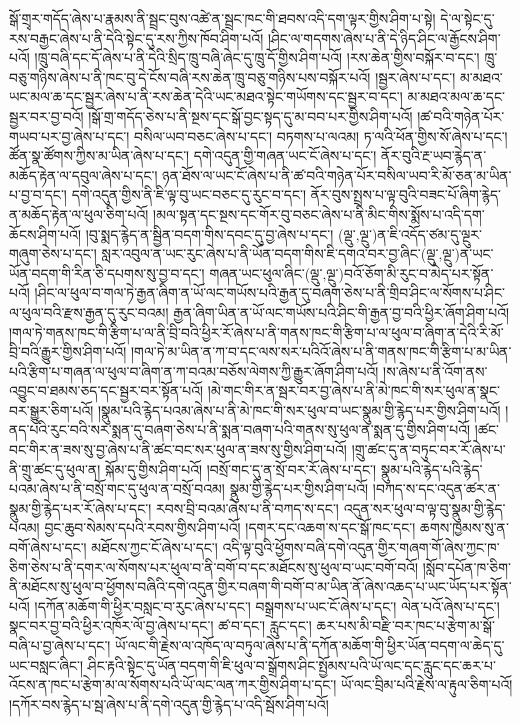 སྒོ་གྲྭར་གདོད་ཞེས་པ་རྣམས་ནི་སྦྲང་བུས་འཚེ་ན་སྦྲང་ཁང་གི་ཐབས་འདི་དག་ལྟར་གྱིས་ཤིག་པ་སྟེ། དེ་ལ་སྟེང་དུ་རས་བརྒྱང་ཞེས་པ་ནི་དེའི་སྟེང་དུ་རས་ཀྱིས་ཁོབ་ཤིག་པའོ། །ཤིང་ལ་གདགས་ཞེས་པ་ནི་དེ་ཉིད་ཤིང་ལ་རྒྱོངས་ཤིག་པའོ། །ཁྲུ་བཞི་དང་དོ་ཞེས་པ་ནི་དེའི་སྲིད་ཁྲུ་བཞི་ཞེང་དུ་ཁྲུ་དོ་གྱིས་ཤིག་པའོ། །རས་ཆེན་གྱིས་བསྐོར་བ་དང་། ཁྲུ་བཅུ་གཉིས་ཞེས་པ་ནི་ཁང་བུ་དེ་ངོས་བཞི་རས་ཆེན་ཁྲུ་བཅུ་གཉིས་པས་བསྐོར་པའོ། །སྦྱར་ཞེས་པ་དང་། མ་མཐའ་ཡང་མལ་ཆ་དང་སྦྱར་ཞེས་པ་ནི་རས་ཆེན་དེའི་ཡང་མཐའ་སྟེང་གཡོགས་དང་སྦྱར་བ་དང་། མ་མཐའ་མལ་ཆ་དང་སྦྱར་བར་བྱ་བའོ། །སྒོ་གྲ་གདོད་ཅེས་པ་ནི་སྔས་དང་སྒོ་བྱང་སྟད་དུ་མ་བབ་པར་གྱིས་ཤིག་པའོ། །ཚ་བའི་གཉེན་པོར་གཡབ་པར་བྱ་ཞེས་པ་དང་། བསིལ་ཡབ་བཅང་ཞེས་པ་དང་། བཏགས་པ་ལའམ། ཏ་ལའི་ཕོན་གྱིས་སོ་ཞེས་པ་དང་། ཚོན་སྣ་ཚོགས་ཀྱིས་མ་ཡིན་ཞེས་པ་དང་། དགེ་འདུན་གྱི་གཞན་ཡང་ངོ་ཞེས་པ་དང་། ནོར་བུའི་རྔ་ཡབ་རྙེད་ན་མཆོད་རྟེན་ལ་དབུལ་ཞེས་པ་དང་། ཉན་ཐོས་ལ་ཡང་ངོ་ཞེས་པ་ནི་ཚ་བའི་གཉེན་པོར་བསིལ་ཡབ་རི་མོ་ཅན་མ་ཡིན་པ་བྱ་བ་དང་། དགེ་འདུན་གྱིས་ནི་ཇི་ལྟ་བུ་ཡང་བཅང་དུ་རུང་བ་དང་། ནོར་བུས་སྤྲས་པ་ལྟ་བུའི་བཟང་པོ་ཞིག་རྙེད་ན་མཆོད་རྟེན་ལ་ཕུལ་ཅིག་པའོ། །མལ་སྟན་དང་སྔས་དང་གོར་བུ་བཅང་ཞེས་པ་ནི་མིང་གིས་སྨོས་པ་འདི་དག་ཆོངས་ཤིག་པའོ། །བུ་སྨད་རྙེད་ན་སྦྱིན་བདག་གིས་དབང་དུ་བྱ་ཞེས་པ་དང་། (ལྡུ་‚ལྔུ་)ན་ཇི་འདོད་ཙམ་དུ་ལྔུར་གཞུག་ཅེས་པ་དང་། སླར་འབུལ་ན་ཡང་རུང་ཞེས་པ་ནི་ཡོན་བདག་གིས་ཇི་དགའ་བར་བྱ་ཞིང་(ལྡུ་‚ལྔུ་)ན་ཡང་ཡོན་བདག་གི་རིན་ཅི་དཔགས་སུ་བྱ་བ་དང་། གཞན་ཡང་ཕུལ་ཞིང་(ལྡུ་‚ལྔུ་)བའོ་ཅོག་མི་རུང་བ་མེད་པར་སྟོན་པའོ། །ཤིང་ལ་ཕུལ་བ་གལ་ཏེ་རྒྱན་ཞིག་ན་ཡོ་ལང་གཡོས་པའི་རྒྱན་དུ་བཞག་ཅེས་པ་ནི་གྲིབ་ཤིང་ལ་སོགས་པ་ཤིང་ལ་ཕུལ་བའི་རྫས་རྒྱན་དུ་རུང་བའམ། རྒྱན་ཞིག་ཡིན་ན་ཡོ་ལང་གཡོས་པའི་ཤིང་གི་རྒྱན་བྱ་བའི་ཕྱིར་ཞོག་ཤིག་པའོ། །གལ་ཏེ་གནས་ཁང་གི་རྩིག་པ་ལ་ནི་བྲི་བའི་ཕྱིར་རོ་ཞེས་པ་ནི་གནས་ཁང་གི་རྩིག་པ་ལ་ཕུལ་བ་ཞིག་ན་དེའི་རི་མོ་བྲི་བའི་རྒྱུར་གྱིས་ཤིག་པའོ། །གལ་ཏེ་མ་ཡིན་ན་ཀ་བ་དང་ལས་སར་པའིའོ་ཞེས་པ་ནི་གནས་ཁང་གི་རྩིག་པ་མ་ཡིན་པའི་རྩིག་པ་གཞན་ལ་ཕུལ་བ་ཞིག་ན་ཀ་བའམ་བཅོས་ལེགས་ཀྱི་རྒྱུར་ཞོག་ཤིག་པའོ། །ས་ཞེས་པ་ནི་འོག་ནས་འབྱུང་བ་ཐམས་ཅད་དང་སྦྱར་བར་སྟོན་པའོ། །མེ་གང་གིར་ན་སྦར་བར་བྱ་ཞེས་པ་ནི་མེ་ཁང་གི་སར་ཕུལ་ན་སྣང་བར་སྒྱུར་ཅིག་པའོ། །སྣུམ་པའི་རྙེད་པའམ་ཞེས་པ་ནི་མེ་ཁང་གི་སར་ཕུལ་བ་ཡང་སྣུམ་གྱི་རྙེད་པར་གྱིས་ཤིག་པའོ། །ནད་པའི་རུང་བའི་སར་སྨན་དུ་བཞག་ཅེས་པ་ནི་སྨན་བཞག་པའི་གནས་སུ་ཕུལ་ན་སྨན་དུ་གྱིས་ཤིག་པའོ། །ཚང་བང་གིར་ན་ཟས་སུ་བྱ་ཞེས་པ་ནི་ཚང་བང་སར་ཕུལ་ན་ཟས་སུ་གྱིས་ཤིག་པའོ། །གྲུ་ཚང་དུ་ན་བཏུང་བར་རོ་ཞེས་པ་ནི་གྲུ་ཚང་དུ་ཕུལ་ན། སྐོམ་དུ་གྱིས་ཤིག་པའོ། །བསྲོ་གང་དུ་ན་སྲོ་བར་རོ་ཞེས་པ་དང་། སྣུམ་པའི་རྙེད་པའི་རྙེད་པའམ་ཞེས་པ་ནི་བསྲོ་གང་དུ་ཕུལ་ན་བསྲོ་བའམ། སྣུམ་གྱི་རྙེད་པར་གྱིས་ཤིག་པའོ། །བཀད་ས་དང་འདུན་ཚར་ན་སྣུམ་གྱི་རྙེད་པར་རོ་ཞེས་པ་དང་། རབས་བྲི་བའམ་ཞེས་པ་ནི་བཀད་ས་དང་། འདུན་སར་ཕུལ་བ་ལྟ་བུ་སྣུམ་གྱི་རྙེད་པའམ། བྱང་ཆུབ་སེམས་དཔའི་རབས་གྱིས་ཤིག་པའོ། །དགར་དང་འཆག་ས་དང་སྒོ་ཁང་དང་། ཆགས་ཁྱམས་སུ་ན་བགོ་ཞེས་པ་དང་། མཐོངས་ཀྱང་ངོ་ཞེས་པ་དང་། འདི་ལྟ་བུའི་ཕྱོགས་བཞི་དགེ་འདུན་གྱིར་གཞག་གོ་ཞེས་ཀྱང་ཁ་ཅིག་ཅེས་པ་ནི་དགར་ལ་སོགས་པར་ཕུལ་བ་ནི་བགོ་བ་དང་མཐོངས་སུ་ཕུལ་བ་ཡང་བགོ་བའོ། །སློབ་དཔོན་ཁ་ཅིག་ནི་མཐོངས་སུ་ཕུལ་བ་ཕྱོགས་བཞིའི་དགེ་འདུན་གྱིར་བཞག་གི་བགོ་བ་མ་ཡིན་ནོ་ཞེས་འཆད་པ་ཡང་ཡོད་པར་སྟོན་པའོ། །དཀོན་མཆོག་གི་ཕྱིར་བསླང་བ་རུང་ཞེས་པ་དང་། བསྒྲགས་པ་ཡང་ངོ་ཞེས་པ་དང་། ལེན་པའོ་ཞེས་པ་དང་། སྣང་བར་བྱ་བའི་ཕྱིར་འཁོར་ལོ་བྱ་ཞེས་པ་དང་། ཚ་བ་དང་། རླུང་དང་། ཆར་པས་མི་བརྫི་བར་ཁང་པ་རྩེག་མ་སྒོ་བཞི་པ་བྱ་ཞེས་པ་དང་། ཡོ་ལང་གི་རྗེས་ལ་འཁོད་ལ་བཏུལ་ཞེས་པ་ནི་དཀོན་མཆོག་གི་ཕྱིར་ཡོན་བདག་ལ་ཆེད་དུ་ཡང་བསླང་ཞིང་། ཤིང་རྟའི་སྟེང་དུ་ཡོན་བདག་གི་ཇི་ཕུལ་བ་སྒྲོགས་ཤིང་སྤྱོམས་པའི་ཡོ་ལང་དང་རླུང་དང་ཆར་པ་འོངས་ན་ཁང་པ་རྩེག་མ་ལ་སོགས་པའི་ཡོ་ལང་ལན་ཀར་གྱིས་ཤིག་པ་དང་། ཡོ་ལང་བྲིམ་པའི་རྗེས་ལ་རྟུལ་ཅིག་པའོ། །དཀོར་བས་རྙེད་པ་སྦ་ཞེས་པ་ནི་དགེ་འདུན་གྱི་རྙེད་པ་འདི་སྦོས་ཤིག་པའོ། 